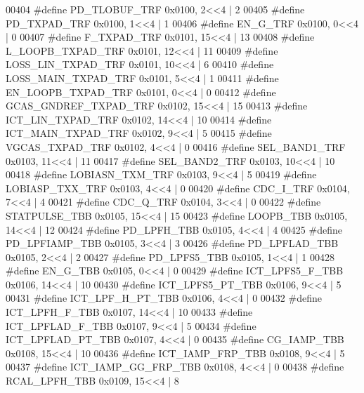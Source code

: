 \begin{DoxyCode}
00404 \textcolor{preprocessor}{#define PD\_TLOBUF\_TRF 0x0100, 2<<4 |  2}
00405 \textcolor{preprocessor}{#define PD\_TXPAD\_TRF 0x0100, 1<<4 |  1}
00406 \textcolor{preprocessor}{#define EN\_G\_TRF 0x0100, 0<<4 |  0}
00407 \textcolor{preprocessor}{#define F\_TXPAD\_TRF 0x0101, 15<<4 |  13}
00408 \textcolor{preprocessor}{#define L\_LOOPB\_TXPAD\_TRF 0x0101, 12<<4 |  11}
00409 \textcolor{preprocessor}{#define LOSS\_LIN\_TXPAD\_TRF 0x0101, 10<<4 |  6}
00410 \textcolor{preprocessor}{#define LOSS\_MAIN\_TXPAD\_TRF 0x0101, 5<<4 |  1}
00411 \textcolor{preprocessor}{#define EN\_LOOPB\_TXPAD\_TRF 0x0101, 0<<4 |  0}
00412 \textcolor{preprocessor}{#define GCAS\_GNDREF\_TXPAD\_TRF 0x0102, 15<<4 |  15}
00413 \textcolor{preprocessor}{#define ICT\_LIN\_TXPAD\_TRF 0x0102, 14<<4 |  10}
00414 \textcolor{preprocessor}{#define ICT\_MAIN\_TXPAD\_TRF 0x0102, 9<<4 |  5}
00415 \textcolor{preprocessor}{#define VGCAS\_TXPAD\_TRF 0x0102, 4<<4 |  0}
00416 \textcolor{preprocessor}{#define SEL\_BAND1\_TRF 0x0103, 11<<4 |  11}
00417 \textcolor{preprocessor}{#define SEL\_BAND2\_TRF 0x0103, 10<<4 |  10}
00418 \textcolor{preprocessor}{#define LOBIASN\_TXM\_TRF 0x0103, 9<<4 |  5}
00419 \textcolor{preprocessor}{#define LOBIASP\_TXX\_TRF 0x0103, 4<<4 |  0}
00420 \textcolor{preprocessor}{#define CDC\_I\_TRF 0x0104, 7<<4 |  4}
00421 \textcolor{preprocessor}{#define CDC\_Q\_TRF 0x0104, 3<<4 |  0}
00422 \textcolor{preprocessor}{#define STATPULSE\_TBB 0x0105, 15<<4 |  15}
00423 \textcolor{preprocessor}{#define LOOPB\_TBB 0x0105, 14<<4 |  12}
00424 \textcolor{preprocessor}{#define PD\_LPFH\_TBB 0x0105, 4<<4 |  4}
00425 \textcolor{preprocessor}{#define PD\_LPFIAMP\_TBB 0x0105, 3<<4 |  3}
00426 \textcolor{preprocessor}{#define PD\_LPFLAD\_TBB 0x0105, 2<<4 |  2}
00427 \textcolor{preprocessor}{#define PD\_LPFS5\_TBB 0x0105, 1<<4 |  1}
00428 \textcolor{preprocessor}{#define EN\_G\_TBB 0x0105, 0<<4 |  0}
00429 \textcolor{preprocessor}{#define ICT\_LPFS5\_F\_TBB 0x0106, 14<<4 |  10}
00430 \textcolor{preprocessor}{#define ICT\_LPFS5\_PT\_TBB 0x0106, 9<<4 |  5}
00431 \textcolor{preprocessor}{#define ICT\_LPF\_H\_PT\_TBB 0x0106, 4<<4 |  0}
00432 \textcolor{preprocessor}{#define ICT\_LPFH\_F\_TBB 0x0107, 14<<4 |  10}
00433 \textcolor{preprocessor}{#define ICT\_LPFLAD\_F\_TBB 0x0107, 9<<4 |  5}
00434 \textcolor{preprocessor}{#define ICT\_LPFLAD\_PT\_TBB 0x0107, 4<<4 |  0}
00435 \textcolor{preprocessor}{#define CG\_IAMP\_TBB 0x0108, 15<<4 |  10}
00436 \textcolor{preprocessor}{#define ICT\_IAMP\_FRP\_TBB 0x0108, 9<<4 |  5}
00437 \textcolor{preprocessor}{#define ICT\_IAMP\_GG\_FRP\_TBB 0x0108, 4<<4 |  0}
00438 \textcolor{preprocessor}{#define RCAL\_LPFH\_TBB 0x0109, 15<<4 |  8}

\end{DoxyCode}
